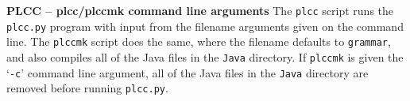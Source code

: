 \begin{minipage}[t]{\sw}
\slidenumber
\LARGE
{\bf PLCC -- plcc/plccmk command line arguments}\exx
The \verb'plcc' script
runs the \verb'plcc.py' program with input
from the filename arguments given on the command line.
The \verb'plccmk' script
does the same, where the filename defaults to \verb'grammar',
and also compiles all of the Java files in the \verb'Java' directory.
If \verb'plccmk' is given the `\verb'-c'' command line argument,
all of the Java files in the \verb'Java' directory are removed
before running \verb'plcc.py'.
\end{minipage}
\clearpage
